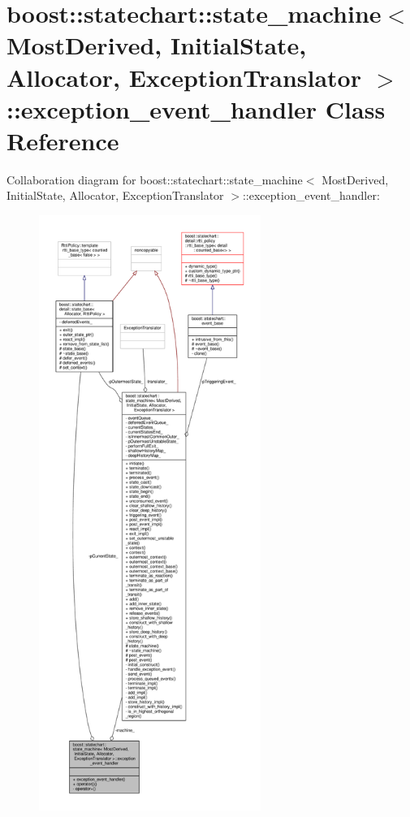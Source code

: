 \hypertarget{classboost_1_1statechart_1_1state__machine_1_1exception__event__handler}{}\section{boost\+:\+:statechart\+:\+:state\+\_\+machine$<$ Most\+Derived, Initial\+State, Allocator, Exception\+Translator $>$\+:\+:exception\+\_\+event\+\_\+handler Class Reference}
\label{classboost_1_1statechart_1_1state__machine_1_1exception__event__handler}


Collaboration diagram for boost\+:\+:statechart\+:\+:state\+\_\+machine$<$ Most\+Derived, Initial\+State, Allocator, Exception\+Translator $>$\+:\+:exception\+\_\+event\+\_\+handler\+:
\nopagebreak
\begin{figure}[H]
\begin{center}
\leavevmode
\includegraphics[height=550pt]{classboost_1_1statechart_1_1state__machine_1_1exception__event__handler__coll__graph}
\end{center}
\end{figure}
